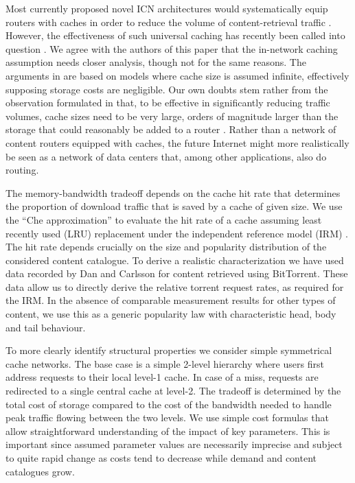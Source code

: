 \documentclass [11pt]{article}
\begin{document}
Most currently proposed novel ICN architectures would systematically equip routers with caches in order to reduce the volume of content-retrieval traffic \cite{ADIKO12}. However, the effectiveness of such universal caching has recently been called into question \cite{Ghodsi2011}. We agree with the authors of this paper that the in-network caching assumption needs closer analysis, though not for the same reasons. The arguments in  \cite{Ghodsi2011} are based on models where cache size is assumed infinite, effectively supposing storage costs are negligible. Our own doubts stem rather from the observation formulated in \cite{FRRS12} that, to be effective in significantly reducing traffic volumes, cache sizes need to be very large, orders of magnitude larger than the storage that could reasonably be added to a router  \cite{PV11}. Rather than a network of content routers equipped with caches, the future Internet might more realistically be seen as a network of data centers that, among other applications, also do routing. 

The memory-bandwidth tradeoff depends on the cache hit rate that determines the proportion of download traffic that is saved by a cache of given size. We use the ``Che approximation'' to evaluate the hit rate of a cache assuming least recently used (LRU) replacement under the independent reference model (IRM) \cite{CTW02,FRR12}. The hit rate depends crucially on the size and popularity distribution of the considered content catalogue. To derive a realistic characterization we have used data recorded by Dan and Carlsson \cite{DC10} for content retrieved using BitTorrent. These data allow us to directly derive the relative torrent request rates, as required for the IRM. In the absence of comparable measurement results for other types of content, we use this as a generic popularity law with characteristic head, body and tail behaviour. 
 
To more clearly identify structural properties we consider simple symmetrical cache networks. The base case is a simple 2-level hierarchy where users first address requests to their local level-1 cache. In case of a miss, requests are redirected to a single central cache at level-2. The tradeoff is determined by the total cost of storage compared to the cost of the bandwidth needed to handle peak traffic flowing between the two levels. We use simple cost formulas that allow straightforward understanding of the impact of key parameters. This is important since assumed parameter values are necessarily imprecise and subject to quite rapid change as costs tend to decrease while demand and content catalogues grow. 
\end{document}
